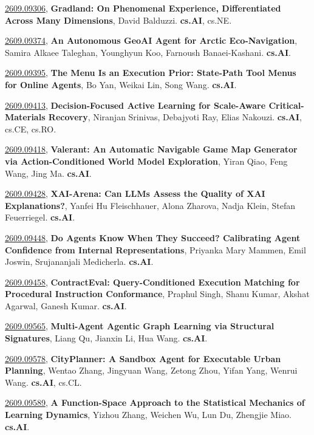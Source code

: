 \documentclass[9pt, a4paper]{article}
\theoremstyle{plain}
\theoremstyle{definition}
\theoremstyle{remark}
\newcommand{\arxivwithtarget}[3]{\hypertarget{#1}{}\href{https://arxiv.org/abs/#1}{#1}, \textbf{\textcolor{arxivblue}{#2}}, #3. }
\begin{document}
\arxivwithtarget{2609.09306}{Gradland: On Phenomenal Experience, Differentiated Across Many Dimensions}{David Balduzzi}\textbf{cs.AI}, cs.NE.



\arxivwithtarget{2609.09374}{An Autonomous GeoAI Agent for Arctic Eco-Navigation}{Samira Alkaee Taleghan, Younghyun Koo, Farnoush Banaei-Kashani}\textbf{cs.AI}.



\arxivwithtarget{2609.09395}{The Menu Is an Execution Prior: State-Path Tool Menus for Online Agents}{Bo Yan, Weikai Lin, Song Wang}\textbf{cs.AI}.



\arxivwithtarget{2609.09413}{Decision-Focused Active Learning for Scale-Aware Critical-Materials Recovery}{Niranjan Srinivas, Debajyoti Ray, Elias Nakouzi}\textbf{cs.AI}, cs.CE, cs.RO.



\arxivwithtarget{2609.09418}{Valerant: An Automatic Navigable Game Map Generator via Action-Conditioned World Model Exploration}{Yiran Qiao, Feng Wang, Jing Ma}\textbf{cs.AI}.



\arxivwithtarget{2609.09428}{XAI-Arena: Can LLMs Assess the Quality of XAI Explanations?}{Yanfei Hu Fleischhauer, Alona Zharova, Nadja Klein, Stefan Feuerriegel}\textbf{cs.AI}.



\arxivwithtarget{2609.09448}{Do Agents Know When They Succeed? Calibrating Agent Confidence from Internal Representations}{Priyanka Mary Mammen, Emil Joswin, Srujananjali Medicherla}\textbf{cs.AI}.



\arxivwithtarget{2609.09458}{ContractEval: Query-Conditioned Execution Matching for Procedural Instruction Conformance}{Praphul Singh, Shanu Kumar, Akshat Agarwal, Ganesh Kumar}\textbf{cs.AI}.



\arxivwithtarget{2609.09565}{Multi-Agent Agentic Graph Learning via Structural Signatures}{Liang Qu, Jianxin Li, Hua Wang}\textbf{cs.AI}.



\arxivwithtarget{2609.09578}{CityPlanner: A Sandbox Agent for Executable Urban Planning}{Wentao Zhang, Jingyuan Wang, Zetong Zhou, Yifan Yang, Wenrui Wang}\textbf{cs.AI}, cs.CL.



\arxivwithtarget{2609.09589}{A Function-Space Approach to the Statistical Mechanics of Learning Dynamics}{Yizhou Zhang, Weichen Wu, Lun Du, Zhengjie Miao}\textbf{cs.AI}.
\end{document}
